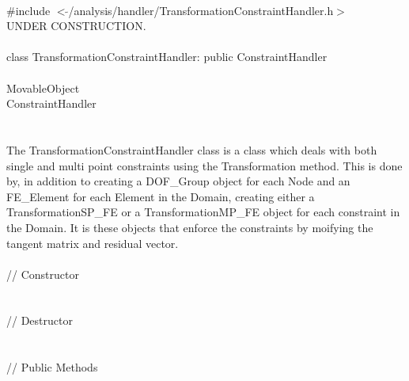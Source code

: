 
   \\
\indent \#include $<\tilde{
}$/analysis/handler/TransformationConstraintHandler.h$>$  \\ 

UNDER CONSTRUCTION.\\

  \\
\indent class TransformationConstraintHandler: public ConstraintHandler  \\

 \\
\indent MovableObject \\
\indent\indent ConstraintHandler \\
\indent\indent{} \\

 \\ 
\indent The TransformationConstraintHandler class is a class which deals with
both single and multi point constraints using the Transformation method. 
This is done by, in addition to creating a DOF\_Group object
for each Node and an FE\_Element for each Element in the Domain,
creating either a TransformationSP\_FE or a TransformationMP\_FE object for each
constraint in the Domain. It is these objects that enforce the
constraints by moifying the tangent matrix and residual vector. \\ 


 \\
\indent // Constructor \\
\\  \\ 
\indent // Destructor \\
\\  \\
\indent // Public Methods\\
 \\ 
 \\ 
\\
\\
 \\
 \\


